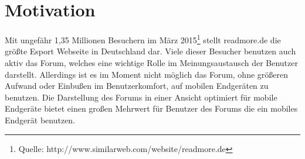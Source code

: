 \section{Motivation}
Mit ungefähr 1,35 Millionen Besuchern im März 2015\footnote{Quelle:
http://www.similarweb.com/website/readmore.de} stellt readmore.de die größte Esport Webseite in Deutschland dar. Viele dieser Besucher benutzen auch aktiv
das Forum, welches eine wichtige Rolle im Meinungsaustausch der Benutzer
darstellt. Allerdings ist es im Moment nicht möglich das Forum, ohne größeren
Aufwand oder Einbußen im Benutzerkomfort, auf mobilen Endgeräten zu benutzen. 
Die Darstellung des Forums in einer Ansicht optimiert für mobile Endgeräte
bietet einen großen Mehrwert für Benutzer des Forums die ein mobiles Endgerät
benutzen.
